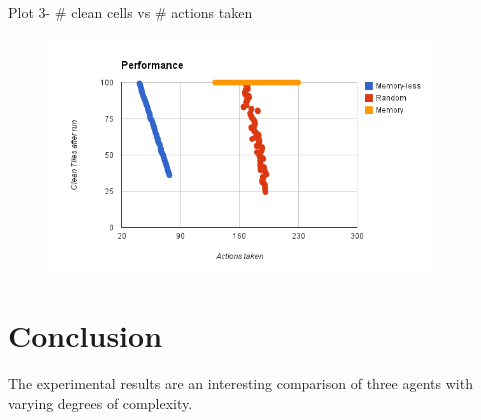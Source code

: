 \documentclass[a4paper,10pt]{article}
\begin{document}
Plot 3- \# clean cells vs \# actions taken
\begin{figure}[H]
	\includegraphics[width=0.9\textwidth]{image2.png}
\end{figure}

\section{Conclusion}
The experimental results are an interesting comparison of three agents with varying degrees of complexity.


\end{document}
